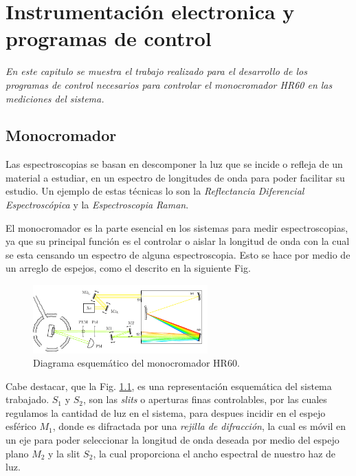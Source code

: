 \chapter{Instrumentación electronica y programas de control}
\label{chap:instrumentation}
\textit{En este capitulo se muestra el trabajo realizado para el desarrollo de los programas de control necesarios
para controlar el monocromador HR60 en las mediciones del sistema.}
\vfill
\minitoc
\newpage

\section{Monocromador}
\label{ch2:monochromator}
Las espectroscopias se basan en descomponer la luz que se incide o refleja de un material a estudiar, en un espectro de longitudes de onda para poder facilitar su estudio. Un ejemplo de estas técnicas lo son la \textit{Reflectancia Diferencial Espectroscópica} y la \textit{Espectroscopia Raman}.
 
El monocromador es la parte esencial en los sistemas para medir espectroscopias, ya que su principal función es el controlar o aislar la longitud de onda con la cual se esta censando un espectro de alguna espectroscopia.\cite{Murty1974} Esto se hace por medio de un arreglo de espejos, como el descrito en la siguiente Fig.

\begin{figure}[H]
    \centering
    \includegraphics[width=0.6\textwidth]{figures/chap2/mono1.pdf}
        \caption{Diagrama esquemático del monocromador HR60.\cite{PdHGaby}}
    \label{fig:mono_diagram}
\end{figure}

Cabe destacar, que la Fig. \ref{fig:mono_diagram}, es una representación esquemática del sistema trabajado. $S_{1}$ y $S_{2}$, son las \textit{slits} o aperturas finas controlables, por las cuales regulamos la cantidad de luz en el sistema, para despues incidir en el espejo esférico $M_{1}$, donde es difractada por una \textit{rejilla de difracción}, la cual es móvil en un eje para poder seleccionar la longitud de onda deseada por medio del espejo plano $M_{2}$ y la slit $S_{2}$, la cual proporciona el ancho espectral de nuestro haz de luz.

